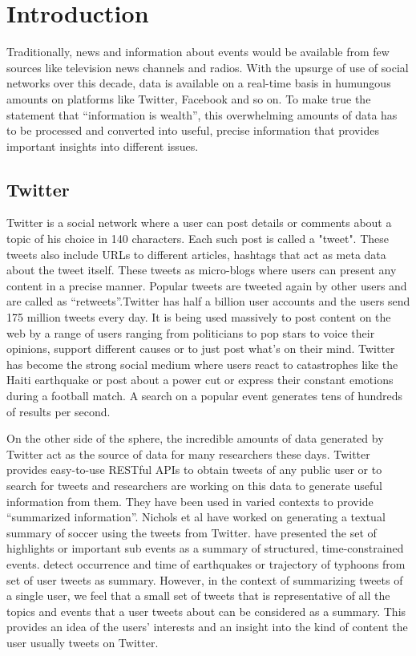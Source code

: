 \chapter{Introduction}
\label{chap-one}

Traditionally, news and information about events would be available from few sources like television news channels and radios. With the upsurge of use of social networks over this decade, data is available on a real-time basis in humungous amounts on platforms like Twitter, Facebook and so on. To make true the statement that “information is wealth”, this overwhelming amounts of data has to be processed and converted into useful, precise information that provides important insights into different issues.

\section{Twitter}
Twitter is a social network where a user can post details or comments about a topic of his choice in 140 characters. Each such post is called a "tweet". These tweets also include URLs to different articles, hashtags that act as meta data about the tweet itself.  These tweets as micro-blogs where users can present any content in a precise manner. Popular tweets are tweeted again by other users and are called as “retweets”.Twitter has half a billion user accounts and the users send 175 million tweets every day. It is being used massively to post content on the web by a range of users ranging from politicians to pop stars to voice their opinions, support different causes or to just post what's on their mind. Twitter has become the strong social medium where users react to catastrophes like the Haiti earthquake or post about a power cut or express their constant emotions during a football match. A search on a popular event generates tens of hundreds of results per second. 

On the other side of the sphere, the incredible amounts of data generated by Twitter act as the source of data for many researchers these days. Twitter provides easy-to-use RESTful APIs to obtain tweets of any public user or to search for tweets and researchers are working on this data to generate useful information from them. They have been used in varied contexts to provide “summarized information”. Nichols et al have worked on generating a textual summary of soccer using the tweets from Twitter. \citet{DBLP:conf/icwsm/ChakrabartiP11} have presented the set of highlights or important sub events as a summary of structured, time-constrained events. \citet{Sakaki:2010:EST:1772690.1772777} detect occurrence and time of earthquakes or trajectory of typhoons from set of user tweets as summary. However, in the context of summarizing tweets of a single user, we feel that a small set of tweets that is representative of all the topics and events that a user tweets about can be considered as a summary. This  provides an idea of the users' interests and an insight into the kind of content the user usually tweets on Twitter.

